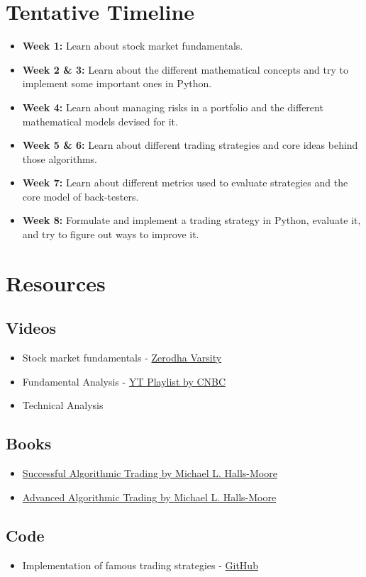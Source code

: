 \documentclass[12pt, letterpaper]{article}
\begin{document}
\section{Tentative Timeline}

\begin{itemize}
    \item \textbf{Week 1:} Learn about stock market fundamentals.
    \item \textbf{Week 2 \& 3:} Learn about the different mathematical concepts and try to implement some important ones in Python.
    \item \textbf{Week 4:} Learn about managing risks in a portfolio and the different mathematical models devised for it.
    \item \textbf{Week 5 \& 6:} Learn about different trading strategies and core ideas behind those algorithms.
    \item \textbf{Week 7:} Learn about different metrics used to evaluate strategies and the core model of back-testers.
    \item \textbf{Week 8:} Formulate and implement a trading strategy in Python, evaluate it, and try to figure out ways to improve it.
\end{itemize}

\section{Resources}

\subsection{Videos}
\begin{itemize}
    \item Stock market fundamentals - \href{https://youtu.be/PQqfeyUQbyE}{Zerodha Varsity}
    \item Fundamental Analysis - \href{https://youtu.be/PQqfeyUQbyE}{YT Playlist by CNBC}
    \item Technical Analysis
\end{itemize}

\subsection{Books}
\begin{itemize}
    \item \href{https://github.com/zslucky/algorithmic_trading_book/blob/master/sat-ebook-20150618.pdf}{Successful Algorithmic Trading by Michael L. Halls-Moore}
    \item \href{https://github.com/zslucky/algorithmic_trading_book/blob/master/aat-ebook-20170711.pdf}{Advanced Algorithmic Trading by Michael L. Halls-Moore}
\end{itemize}

\subsection{Code}
\begin{itemize}
    \item Implementation of famous trading strategies - \href{https://github.com/je-suis-tm/quant-trading}{GitHub}
\end{itemize}
\end{document}

